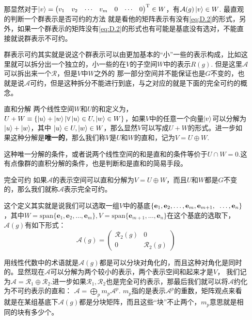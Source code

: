 那显然对于$\ket{v}=\begin{pmatrix}v_1&v_2&\cdots&v_m&0&\cdots&0\end{pmatrix}^{\mathrm{T}}\in W$，有$\mathcal{A}(g)\ket{v}\in W$. 最直观的判断一个群表示是否可约的方法
就是看他的矩阵表示有没有\ref{eq:D.2}的形式，另外，如果一个群表示的矩阵没有\ref{eq:D.2}的形式也有可能是基底没有选对，不能直接就说群表示不可约。

群表示可约其实就是说这个群表示可以由更加基本的“小”一些的表示构成，比如这里就可以拆分出一个独立的，小一些的在$V$的子空间$W$中的表示$R(g)$. 但是这里$\mathscr{A}$可以拆出来一个$\mathscr{R}$，但是$V$中$W$之外的
那一部分空间并不能保证也是$G$不变的，也就是说$\mathscr{A}$可约，但是这种拆分不能进行到底，与之对应的就是下面的完全可约的概念。
\begin{define}{直和分解}
    两个线性空间$W$和$U$的和定义为，$U+W\equiv \{\ket{u}+\ket{w}|\forall \ket{u}\in U,\ket{w}\in W\}$，如果$V$中的任意一个向量$\ket{v}$可以分解为$\ket{u}+\ket{w}$，其中
    $\ket{u}\in U,\ket{w}\in W$，那么显然$V$可以写成$U+W$的形式。进一步如果这种分解是\textbf{唯一的}，那么我们称$V$是$U$和$W$的直和，记为$V=U\oplus W$.

    \setlength\parindent{2em}这种唯一分解的条件，或者说两个线性空间的和是直和的条件等价于$U\cap W={0}$.这有点像群的直积分解的条件，也是判断和是直和的简易手段。
\end{define}
\begin{define}{完全可约}
    如果$\mathscr{A}$的表示空间可以直和分解为$V=U\oplus W$，而且$U$和$W$都是$G$不变的，那么我们就称$\mathscr{A}$表示完全可约。
\end{define}
这个定义其实就是说我们可以选取一组$V$中的基底$\left\{\mathbf{e}_1,\mathbf{e}_2,\ldots,\mathbf{e}_m,\mathbf{e}_{m+1},\right.\\\left.\ldots,\mathbf{e}_n\right\}$，其中$W=\mathrm{span}\{\mathbf{e}_1,\mathbf{e}_2,\ldots,\mathbf{e}_m\},V=\mathrm{span}\{\mathbf{e}_{m+1},\ldots,\mathbf{e}_n\}$在这个基底的选取下，
$\mathcal{A}(g)$有如下形式：
\begin{equation}
    \label{eq:D.3}
    \mathcal{A}(g)=\begin{pmatrix}
        \mathcal{R}_2(g) &{0} \\
         {0} & \mathcal{R}_2(g)
       \end{pmatrix}
\end{equation}

用线性代数中的术语就是$\mathcal{A}(g)$都是可以分块对角化的，而且这种对角化是同时的。显然现在$\mathscr{A}$可以分解为两个较小的表示，两个表示空间和起来才是$V$，
我们记为$\mathscr{A}=\mathscr{R}_1\oplus\mathscr{R}_2$.进一步如果$\mathscr{R}_1,\mathscr{R}_2$也是完全可约表示，那最后我们就可以将$\mathscr{A}$约化为不可约表示的直和：
$\mathscr{A}=\bigoplus_p m_p\mathscr{A}^p$. $m_p$指的是表示$\mathscr{A}^p$的重数，矩阵观点来看就是在某组基底下$\mathcal{A}(g)$都是分块矩阵，而且这些“块”不止两个，$m_p$意思就是相同的块有多少个。

